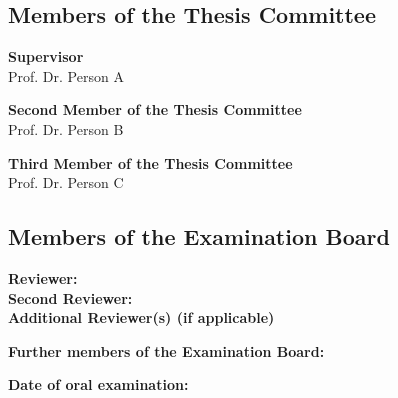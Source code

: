\newpage
\thispagestyle{empty}
\vspace*{\fill}

\subsection*{Members of the Thesis Committee}
{\footnotesize \raggedright
\textbf{Supervisor} \\
Prof. Dr. Person A \\
\vspace{0.15cm}

\textbf{Second Member of the Thesis Committee} \\
Prof. Dr. Person B \\
\vspace{0.15cm}

\textbf{Third Member of the Thesis Committee} \\
Prof. Dr. Person C \\
\vspace{0.15cm}

\subsection*{Members of the Examination Board}

\textbf{Reviewer:} \\
\textbf{Second Reviewer:} \\
\textbf{Additional Reviewer(s) (if applicable)} \\
\vspace{0.15cm}

\textbf{Further members of the Examination Board:} \\
\vspace{0.5cm}

\textbf{Date of oral examination:} 
}
\newpage
